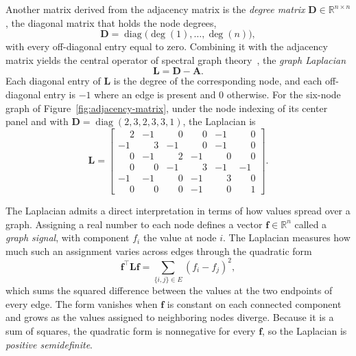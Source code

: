 Another matrix derived from the adjacency matrix is the 
\textit{degree matrix} $\mathbf{D} \in \mathbb{R}^{n \times n}$, 
the diagonal matrix that holds the node degrees,
\begin{equation}
  \mathbf{D} = \operatorname{diag}\bigl(\deg(1), \ldots, \deg(n)\bigr),
  \label{eq:degree-matrix}
\end{equation}
with every off-diagonal entry equal to zero. Combining it with the adjacency
matrix yields the central operator of spectral graph
theory~\cite{chung1997}, the \textit{graph Laplacian}
\begin{equation}
  \mathbf{L} = \mathbf{D} - \mathbf{A}.
  \label{eq:laplacian}
\end{equation}
Each diagonal entry of $\mathbf{L}$ is the degree of the corresponding node,
and each off-diagonal entry is $-1$ where an edge is present and $0$
otherwise. For the six-node graph of Figure~\ref{fig:adjacency-matrix},
under the node indexing of its center panel and with
$\mathbf{D} = \operatorname{diag}(2, 3, 2, 3, 3, 1)$, the Laplacian is
\[
  \mathbf{L} =
  \begin{bmatrix}
    \phantom{-}2 & -1 & \phantom{-}0 & \phantom{-}0 & -1 & \phantom{-}0 \\
    -1 & \phantom{-}3 & -1 & \phantom{-}0 & -1 & \phantom{-}0 \\
    \phantom{-}0 & -1 & \phantom{-}2 & -1 & \phantom{-}0 & \phantom{-}0 \\
    \phantom{-}0 & \phantom{-}0 & -1 & \phantom{-}3 & -1 & -1 \\
    -1 & -1 & \phantom{-}0 & -1 & \phantom{-}3 & \phantom{-}0 \\
    \phantom{-}0 & \phantom{-}0 & \phantom{-}0 & -1 & \phantom{-}0 & \phantom{-}1
  \end{bmatrix}.
\]

The Laplacian admits a direct interpretation in terms of how values spread
over a graph. Assigning a real number to each node defines a vector
$\mathbf{f} \in \mathbb{R}^n$ called a \textit{graph signal},
with component $f_i$ the value at node $i$. The Laplacian measures how much
such an assignment varies across edges through the quadratic form
\begin{equation}
  \mathbf{f}^\top \mathbf{L} \mathbf{f}
  = \sum_{\{i, j\} \in E} (f_i - f_j)^2,
  \label{eq:laplacian-quadratic-form}
\end{equation}
which sums the squared difference between the values at the two endpoints of
every edge. The form vanishes when $\mathbf{f}$ is constant on each connected
component and grows as the values assigned to neighboring nodes diverge.
Because it is a sum of squares, the quadratic form is nonnegative for every
$\mathbf{f}$, so the Laplacian is \textit{positive semidefinite}.

